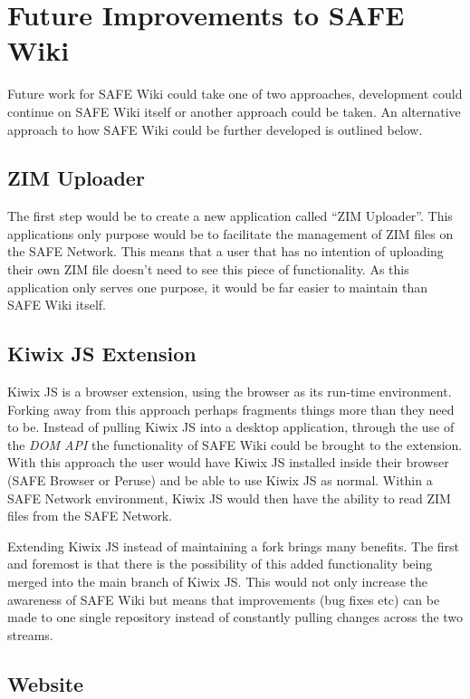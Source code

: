\section{Future Improvements to SAFE Wiki}

Future work for SAFE Wiki could take one of two approaches, development could continue on SAFE Wiki itself or another approach could be taken. An alternative approach to how SAFE Wiki could be further developed is outlined below.

\subsection{ZIM Uploader}

The first step would be to create a new application called ``ZIM Uploader''. This applications only purpose would be to facilitate the management of ZIM files on the SAFE Network. This means that a user that has no intention of uploading their own ZIM file doesn't need to see this piece of functionality. As this application only serves one purpose, it would be far easier to maintain than SAFE Wiki itself.

\subsection{Kiwix JS Extension}
\label{subsec:kiwix-js-safe}

Kiwix JS is a browser extension, using the browser as its run-time environment. Forking away from this approach perhaps fragments things more than they need to be. Instead of pulling Kiwix JS into a desktop application, through the use of the \textit{DOM API} the functionality of SAFE Wiki could be brought to the extension. With this approach the user would have Kiwix JS installed inside their browser (SAFE Browser or Peruse) and be able to use Kiwix JS as normal. Within a SAFE Network environment, Kiwix JS would then have the ability to read ZIM files from the SAFE Network.

Extending Kiwix JS instead of maintaining a fork brings many benefits. The first and foremost is that there is the possibility of this added functionality being merged into the main branch of Kiwix JS. This would not only increase the awareness of SAFE Wiki but means that improvements (bug fixes etc) can be made to one single repository instead of constantly pulling changes across the two streams.

\subsection{Website}

